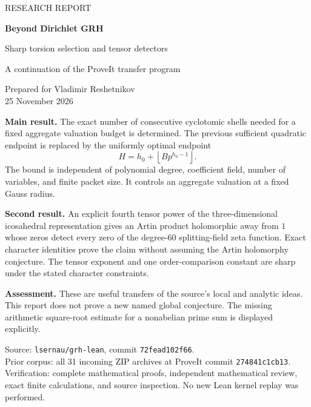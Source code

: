 \documentclass[11pt]{article}
\theoremstyle{definition}
\theoremstyle{remark}
\newcommand{\floor}[1]{\left\lfloor #1\right\rfloor}
\begin{document}
\hypersetup{pageanchor=false}
\begin{titlepage}
\vspace*{14mm}
{\color{accent}\large RESEARCH REPORT\par}
\vspace{7mm}
{\color{ink}\Huge\bfseries Beyond Dirichlet GRH\par}
\vspace{5mm}
{\color{ink}\LARGE Sharp torsion selection and tensor detectors\par}
\vspace{9mm}
{\large A continuation of the ProveIt transfer program\par}
\vspace{3mm}
Prepared for Vladimir Reshetnikov\\
25 November 2026
\vspace{12mm}

\textbf{Main result.} The exact number of consecutive cyclotomic shells needed for a fixed aggregate valuation budget is determined. The previous sufficient quadratic endpoint is replaced by the uniformly optimal endpoint
\[
\boxed{\quad H=h_0+\floor{B p^{h_0-1}}.\quad}
\]
The bound is independent of polynomial degree, coefficient field, number of variables, and finite packet size. It controls an aggregate valuation at a fixed Gauss radius.

\textbf{Second result.} An explicit fourth tensor power of the three-dimensional icosahedral representation gives an Artin product holomorphic away from \(1\) whose zeros detect every zero of the degree-60 splitting-field zeta function. Exact character identities prove the claim without assuming the Artin holomorphy conjecture. The tensor exponent and one order-comparison constant are sharp under the stated character constraints.

\textbf{Assessment.} These are useful transfers of the source's local and analytic ideas. This report does not prove a new named global conjecture. The missing arithmetic square-root estimate for a nonabelian prime sum is displayed explicitly.

\vfill
{\small Source: \texttt{lsernau/grh-lean}, commit \texttt{72fead102f66}.\\
Prior corpus: all 31 incoming ZIP archives at ProveIt commit \texttt{274841c1cb13}.\\
Verification: complete mathematical proofs, independent mathematical review, exact finite calculations, and source inspection. No new Lean kernel replay was performed.}
\end{titlepage}
\end{document}
